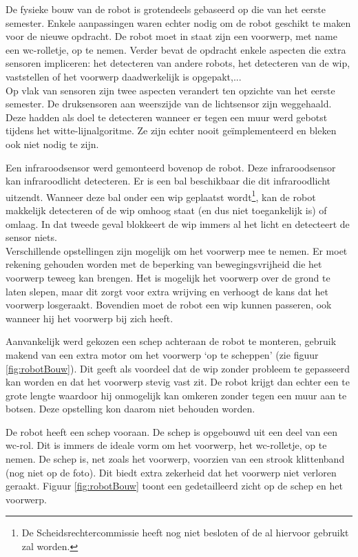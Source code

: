\documentclass[tt1]{penoverslag}
\begin{document}
De fysieke bouw van de robot is grotendeels gebaseerd op die van het eerste semester. Enkele aanpassingen waren echter nodig om de robot geschikt te maken voor de nieuwe opdracht. De robot moet in staat zijn een voorwerp, met name een wc-rolletje, op te nemen. Verder bevat de opdracht enkele aspecten die extra sensoren impliceren: het detecteren van andere robots, het detecteren van de wip, vaststellen of het voorwerp daadwerkelijk is opgepakt,...\\
 
Op vlak van sensoren zijn twee aspecten verandert ten opzichte van het eerste semester. De druksensoren aan weerszijde van de lichtsensor zijn weggehaald. Deze hadden als doel te detecteren wanneer er tegen een muur werd gebotst tijdens het witte-lijnalgoritme. Ze zijn echter nooit ge\"implementeerd en bleken ook niet nodig te zijn.

Een infraroodsensor werd gemonteerd bovenop de robot. Deze infraroodsensor kan infraroodlicht detecteren. Er is een bal beschikbaar die dit infraroodlicht uitzendt. Wanneer deze bal onder een wip geplaatst wordt\footnote{De Scheidsrechtercommissie heeft nog niet besloten of de al hiervoor gebruikt zal worden.}, kan de robot makkelijk detecteren of de wip omhoog staat (en dus niet toegankelijk is) of omlaag. In dat tweede geval blokkeert de wip immers al het licht en detecteert de sensor niets.\\

Verschillende opstellingen zijn mogelijk om het voorwerp mee te nemen. Er moet rekening gehouden worden met de beperking van bewegingsvrijheid die het voorwerp teweeg kan brengen. Het is mogelijk het voorwerp over de grond te laten slepen, maar dit zorgt voor extra wrijving en verhoogt de kans dat het voorwerp losgeraakt. Bovendien moet de robot een wip kunnen passeren, ook wanneer hij het voorwerp bij zich heeft. 
 
Aanvankelijk werd gekozen een schep achteraan de robot te monteren, gebruik makend van een extra motor om het voorwerp `op te scheppen' (zie figuur \ref{fig:robotBouw}). Dit geeft als voordeel dat de wip zonder probleem te gepasseerd kan worden en dat het voorwerp stevig vast zit. De robot krijgt dan echter een te grote lengte waardoor hij onmogelijk kan omkeren zonder tegen een muur aan te botsen. Deze opstelling kon daarom niet behouden worden.

De robot heeft een schep vooraan. De schep is opgebouwd uit een deel van een wc-rol. Dit is immers de ideale vorm om het voorwerp, het wc-rolletje, op te nemen. De schep is, net zoals het voorwerp, voorzien van een strook klittenband (nog niet op de foto). Dit biedt extra zekerheid dat het voorwerp niet verloren geraakt. Figuur \ref{fig:robotBouw} toont een gedetailleerd zicht op de schep en het voorwerp.\\
\end{document}
